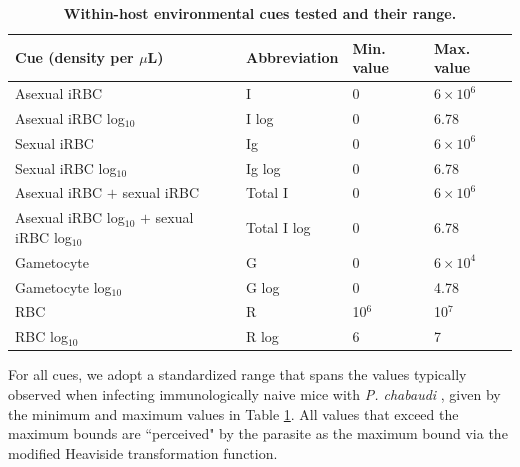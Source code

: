 \documentclass[10pt,letterpaper]{article}
\begin{document}
\begin{table}[!ht]
\centering
\caption{
{\bf Within-host environmental cues tested and their range.}}
\begin{tabular}{@{}llll@{}}
\toprule
Cue (density per $\mu$L)& Abbreviation & Min. value & Max. value\\ \midrule
Asexual iRBC & I & 0 &$6 \times 10^6$\\
Asexual iRBC log$_{10}$ & I log&0&6.78\\
Sexual iRBC &Ig&0&$6 \times 10^6$\\
Sexual iRBC log$_{10}$ &Ig log&0&6.78\\
Asexual iRBC $+$ sexual iRBC & Total I&0&$6 \times 10^6$\\
Asexual iRBC log$_{10}$ $+$ sexual iRBC log$_{10}$ &Total I log&0&6.78\\
Gametocyte & G&0&$6 \times 10^4$\\
Gametocyte log$_{10}$ & G log&0&4.78\\
RBC &R&10$^6$&10$^7$        \\
RBC log$_{10}$ & R log&6&7     \\ 
\bottomrule
\end{tabular}
\label{table3}
\end{table}

For all cues, we adopt a standardized range that spans the values typically observed when infecting immunologically naive mice with \emph{P. chabaudi} \cite{pollitt_competition_2011}, given by the minimum and maximum values in Table \ref{table3}. All values that exceed the maximum bounds are ``perceived" by the parasite as the maximum bound via the modified Heaviside transformation function.
\end{document}
